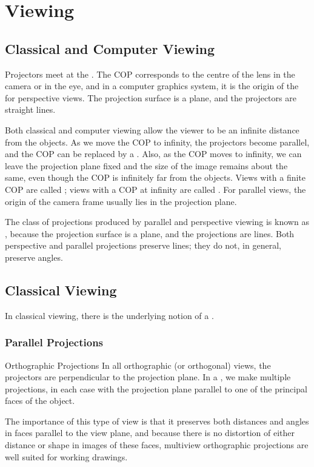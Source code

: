 \documentclass[../COS3712_Notes.tex]{subfiles}
\begin{document}
  \setcounter{chapter}{4}
  \chapter{Viewing}
    \section{Classical and Computer Viewing}
      Projectors meet at the .
      The COP corresponds to the centre of the lens in the camera or in the eye,
      and in a computer graphics system, it is the origin of the 
      for perspective views.
      The projection surface is a plane, and the projectors are straight lines.

      Both classical and computer viewing allow the viewer to be an infinite distance
      from the objects.
      As we move the COP to infinity, the projectors become parallel, and the COP can be
      replaced by a .
      Also, as the COP moves to infinity, we can leave the projection plane fixed
      and the size of the image remains about the same, even though the COP is infinitely
      far from the objects.
      Views with a finite COP are called ;
      views with a COP at infinity are called .
      For parallel views, the origin of the camera frame usually lies in the projection plane.

      The class of projections produced by parallel and perspective viewing is known as
      , because the projection surface is a plane,
      and the projections are lines.
      Both perspective and parallel projections preserve lines;
      they do not, in general, preserve angles.

    \section{Classical Viewing}
      In classical viewing, there is the underlying notion of a .

      \subsection{Parallel Projections}
        \begin{definition}{Orthographic Projections}
          In all orthographic (or orthogonal) views, the projectors are perpendicular
          to the projection plane.
          In a , we make multiple projections,
          in each case with the projection plane parallel to one of the principal faces
          of the object.

          The importance of this type of view is that it preserves both distances and angles
          in faces parallel to the view plane,
          and because there is no distortion of either distance or shape in images of these faces,
          multiview orthographic projections are well suited for working drawings.
        \end{definition}
\end{document}
